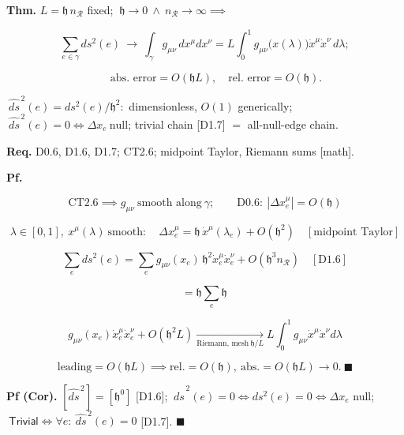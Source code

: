 \begin{theorem}\label{tag:CT1-19}
\textbf{Thm.} $L=\mathfrak h\,n_{\mathcal R}$ fixed; $\ \mathfrak h\to0\ \wedge\ n_{\mathcal R}\to\infty\implies$

\[
\sum_{e\in\gamma}ds^2(e)\ \longrightarrow\ \int_\gamma g_{\mu\nu}\,dx^\mu dx^\nu=L\int_0^1g_{\mu\nu}\bigl(x(\lambda)\bigr)\dot x^\mu\dot x^\nu\,d\lambda;
\]

\[
\qquad \text{abs.\ error}=O(\mathfrak hL),\quad\text{rel.\ error}=O(\mathfrak h).
\]

\end{theorem}

\begin{corollary}[{\texorpdfstring{CT1.19a}{CT1.19a}}]\label{tag:CT1-19a}
$\ \widehat{ds}^{\,2}(e)=ds^2(e)/\mathfrak h^2:$ dimensionless, $O(1)$ generically; $\ \widehat{ds}^{\,2}(e)=0\iff\Delta x_e\ \text{null}$; trivial chain [D1.7] $=$ all-null-edge chain.

\textbf{Req.} D0.6, D1.6, D1.7; CT2.6; midpoint Taylor, Riemann sums [math].

\textbf{Pf.}

\[
\mathrm{CT2.6}\implies g_{\mu\nu}\ \text{smooth along}\ \gamma;\qquad
\mathrm{D0.6}:\ |\Delta x^\mu_e|=O(\mathfrak h)
\]

\[
\lambda\in[0,1],\ x^\mu(\lambda)\ \text{smooth}:\quad\Delta x^\mu_e=\mathfrak h\,\dot x^\mu(\lambda_e)+O(\mathfrak h^2)\quad[\text{midpoint Taylor}]
\]

\[
\sum_{e}ds^2(e)=\sum_e g_{\mu\nu}(x_e)\,\mathfrak h^2\dot x^\mu_e\dot x^\nu_e+O(\mathfrak h^3n_{\mathcal R})\quad[\mathrm{D1.6}]
\]

\[
= \mathfrak h\sum_e\mathfrak h\,
\]

\[
g_{\mu\nu}(x_e)\dot x^\mu_e\dot x^\nu_e+O(\mathfrak h^2L)\xrightarrow[\text{Riemann, mesh}\ \mathfrak h/L]{}L\int_0^1g_{\mu\nu}\dot x^\mu\dot x^\nu d\lambda
\]

\[
\text{leading}=O(\mathfrak hL)\implies\text{rel.}=O(\mathfrak h),\ \text{abs.}=O(\mathfrak hL)\to0.\ \blacksquare
\]

\textbf{Pf (Cor).} $[\widehat{ds}^{\,2}]=[\mathfrak h^0]$ [D1.6]; $\ \widehat{ds}^{\,2}(e)=0\iff ds^2(e)=0\iff\Delta x_e$ null; $\ \mathsf{Trivial}\iff\forall e:\ \widehat{ds}^{\,2}(e)=0$ [D1.7]. $\blacksquare$


\end{corollary}
